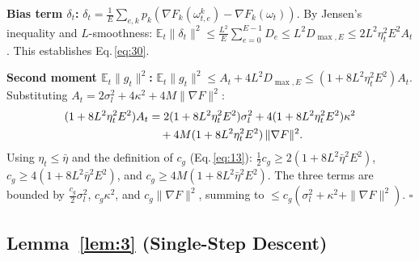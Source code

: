 \noindent\textbf{Bias term \(\delta_t\):}
\(\delta_t = \frac{1}{E}\sum_{e,k} p_k(\nabla F_k(\omega_{t,e}^k) - \nabla F_k(\omega_t))\).
By Jensen's inequality and \(L\)-smoothness:
\(\mathbb E_t\|\delta_t\|^2 \le \frac{L^2}{E}\sum_{e=0}^{E-1} D_e
 \le L^2 D_{\max,E} \le 2L^2\eta_t^2 E^2 A_t\).\;
This establishes Eq.\,\eqref{eq:30}.

\noindent\textbf{Second moment \(\mathbb E_t\|g_t\|^2\):}
\(\mathbb E_t\|g_t\|^2 \le A_t + 4L^2 D_{\max,E} \le (1+8L^2\eta_t^2 E^2)A_t\).
Substituting \(A_t = 2\sigma_l^2 + 4\kappa^2 + 4M\|\nabla F\|^2\):
\begin{align*}
  (1+8L^2\eta_t^2 E^2)A_t
  &= 2(1+8L^2\eta_t^2 E^2)\sigma_l^2
     + 4(1+8L^2\eta_t^2 E^2)\kappa^2 \notag\\
  &\quad + 4M(1+8L^2\eta_t^2 E^2)\,\|\nabla F\|^2.
\end{align*}
Using \(\eta_t \le \bar\eta\) and the definition of \(c_g\) (Eq.\,\eqref{eq:13}):
\(\frac{1}{2}c_g \ge 2(1+8L^2\bar\eta^2 E^2)\),
\(c_g \ge 4(1+8L^2\bar\eta^2 E^2)\), and
\(c_g \ge 4M(1+8L^2\bar\eta^2 E^2)\).
The three terms are bounded by \(\frac{c_g}{2}\sigma_l^2\), \(c_g\kappa^2\), and \(c_g\|\nabla F\|^2\),
summing to \(\le c_g(\sigma_l^2 + \kappa^2 + \|\nabla F\|^2)\). \(\square\)

\subsection*{Lemma~\ref{lem:3} (Single-Step Descent)}

